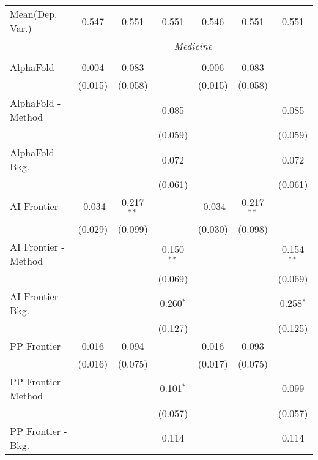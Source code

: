\begin{tabular}{lcccccc}
Mean(Dep. Var.) & 0.547 & 0.551 & 0.551 & 0.546 & 0.551 & 0.551 \\
 & \multicolumn{6}{c}{\textit{Medicine}} \\ \\
   AlphaFold            & 0.004   & 0.083        &              & 0.006   & 0.083        &   \\   
                        & (0.015) & (0.058)      &              & (0.015) & (0.058)      &   \\   
   AlphaFold - Method   &         &              & 0.085        &         &              & 0.085\\   
                        &         &              & (0.059)      &         &              & (0.059)\\   
   AlphaFold - Bkg.     &         &              & 0.072        &         &              & 0.072\\   
                        &         &              & (0.061)      &         &              & (0.061)\\   
   AI Frontier          & -0.034  & 0.217$^{**}$ &              & -0.034  & 0.217$^{**}$ &   \\   
                        & (0.029) & (0.099)      &              & (0.030) & (0.098)      &   \\   
   AI Frontier - Method &         &              & 0.150$^{**}$ &         &              & 0.154$^{**}$\\   
                        &         &              & (0.069)      &         &              & (0.069)\\   
   AI Frontier - Bkg.   &         &              & 0.260$^{*}$  &         &              & 0.258$^{*}$\\   
                        &         &              & (0.127)      &         &              & (0.125)\\   
   PP Frontier          & 0.016   & 0.094        &              & 0.016   & 0.093        &   \\   
                        & (0.016) & (0.075)      &              & (0.017) & (0.075)      &   \\   
   PP Frontier - Method &         &              & 0.101$^{*}$  &         &              & 0.099\\   
                        &         &              & (0.057)      &         &              & (0.057)\\   
   PP Frontier - Bkg.   &         &              & 0.114        &         &              & 0.114\\   

\end{tabular}
